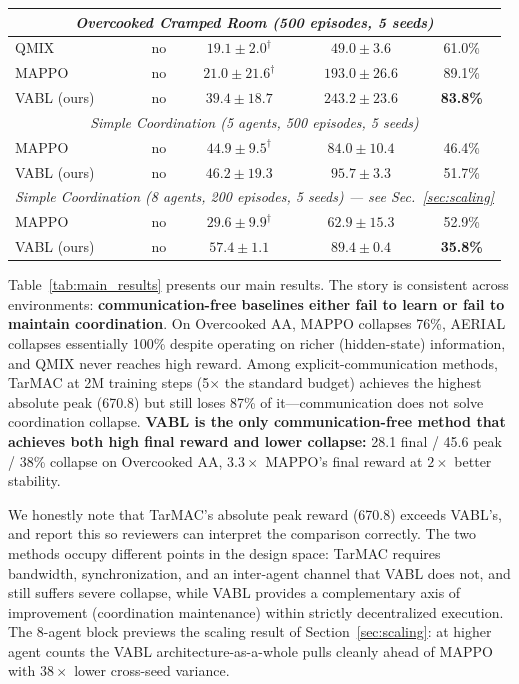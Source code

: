 \documentclass{article}
\theoremstyle{plain}
\theoremstyle{definition}
\theoremstyle{remark}
\begin{document}
\begin{table}[tb]
\begin{tabular}{lcccc}
\midrule
\multicolumn{5}{c}{\textit{Overcooked Cramped Room (500 episodes, 5 seeds)}} \\
\midrule
QMIX & no & $19.1 \pm 2.0^\dagger$ & $49.0 \pm 3.6$ & 61.0\% \\
MAPPO & no & $21.0 \pm 21.6^\dagger$ & $193.0 \pm 26.6$ & 89.1\% \\
VABL (ours) & no & $\mathbf{39.4 \pm 18.7}$ & $\mathbf{243.2 \pm 23.6}$ & \textbf{83.8\%} \\
\midrule
\multicolumn{5}{c}{\textit{Simple Coordination (5 agents, 500 episodes, 5 seeds)}} \\
\midrule
MAPPO & no & $44.9 \pm 9.5^\dagger$ & $84.0 \pm 10.4$ & 46.4\% \\
VABL (ours) & no & $\mathbf{46.2 \pm 19.3}$ & $\mathbf{95.7 \pm 3.3}$ & 51.7\% \\
\midrule
\multicolumn{5}{c}{\textit{Simple Coordination (8 agents, 200 episodes, 5 seeds) --- see Sec.\ \ref{sec:scaling}}} \\
\midrule
MAPPO & no & $29.6 \pm 9.9^\dagger$ & $62.9 \pm 15.3$ & 52.9\% \\
VABL (ours) & no & $\mathbf{57.4 \pm 1.1}$ & $\mathbf{89.4 \pm 0.4}$ & \textbf{35.8\%} \\
\bottomrule
\end{tabular}
\endgroup
\end{table}

Table~\ref{tab:main_results} presents our main results. The story is consistent across environments: \textbf{communication-free baselines either fail to learn or fail to maintain coordination}. On Overcooked AA, MAPPO collapses 76\%, AERIAL collapses essentially 100\% despite operating on richer (hidden-state) information, and QMIX never reaches high reward. Among explicit-communication methods, TarMAC at 2M training steps (5$\times$ the standard budget) achieves the highest absolute peak (670.8) but still loses 87\% of it---communication does not solve coordination collapse. \textbf{VABL is the only communication-free method that achieves both high final reward and lower collapse:} 28.1 final / 45.6 peak / 38\% collapse on Overcooked AA, $3.3\times$ MAPPO's final reward at $2\times$ better stability.

We honestly note that TarMAC's absolute peak reward (670.8) exceeds VABL's, and report this so reviewers can interpret the comparison correctly. The two methods occupy different points in the design space: TarMAC requires bandwidth, synchronization, and an inter-agent channel that VABL does not, and still suffers severe collapse, while VABL provides a complementary axis of improvement (coordination maintenance) within strictly decentralized execution. The 8-agent block previews the scaling result of Section~\ref{sec:scaling}: at higher agent counts the VABL architecture-as-a-whole pulls cleanly ahead of MAPPO with $38\times$ lower cross-seed variance.
\end{document}
